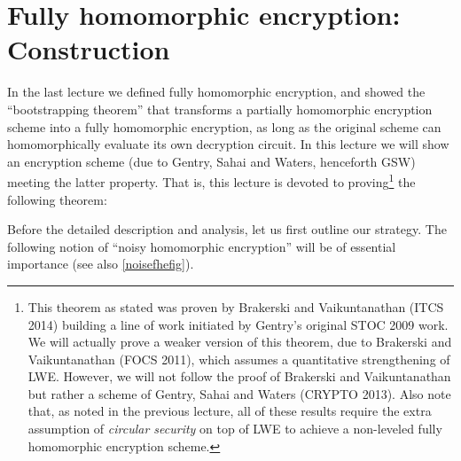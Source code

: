 \chapter{Fully homomorphic encryption: Construction}\label{chapfhetwo}

In the last lecture we defined fully homomorphic encryption, and showed
the ``bootstrapping theorem'' that transforms a partially homomorphic
encryption scheme into a fully homomorphic encryption, as long as the
original scheme can homomorphically evaluate its own decryption circuit.
In this lecture we will show an encryption scheme (due to Gentry, Sahai
and Waters, henceforth GSW) meeting the latter property. That is, this
lecture is devoted to proving\footnote{This theorem as stated was proven
  by Brakerski and Vaikuntanathan (ITCS 2014) building a line of work
  initiated by Gentry's original STOC 2009 work. We will actually prove
  a weaker version of this theorem, due to Brakerski and Vaikuntanathan
  (FOCS 2011), which assumes a quantitative strengthening of LWE.
  However, we will not follow the proof of Brakerski and Vaikuntanathan
  but rather a scheme of Gentry, Sahai and Waters (CRYPTO 2013). Also
  note that, as noted in the previous lecture, all of these results
  require the extra assumption of \emph{circular security} on top of LWE
  to achieve a non-leveled fully homomorphic encryption scheme.} the
following theorem:

\hypertarget{LWEFHEthm}{}

Before the detailed description and analysis, let us first outline our
strategy. The following notion of ``noisy homomorphic encryption'' will
be of essential importance (see also \cref{noisefhefig}).

